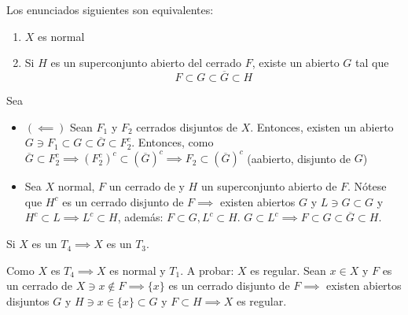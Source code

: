 \begin{teorema}
    Los enunciados siguientes son equivalentes: 
    \begin{enumerate}
        \item $X$ es normal 
        \item Si $H$ es un superconjunto abierto del cerrado $F$, existe un abierto $G$ tal que 
        $$F\subset G\subset \overline{G}\subset H$$
    \end{enumerate}
    \begin{dem}
        Sea
        \begin{itemize}
            \item $(\impliedby)$ Sean $F_1$ y $F_2$ cerrados disjuntos de $X$. Entonces, existen un abierto $G\ni F_1\subset G\subset \overline{G}\subset F_2^c$. Entonces, como $\overline{G}\subset F_2^c\implies (F_2^c)^c\subset (\overline{G})^c\implies F_2\subset (\overline{G})^c$ (aabierto, disjunto de $G$)
            \item Sea $X$ normal, $F$ un cerrado de y $H$ un superconjunto abierto de $F$. Nótese que $H^c$ es un cerrado disjunto de $F\implies$ existen abiertos $G$ y $L\ni G\subset G$ y $H^c \subset L\implies L^c\subset H$, además: $F\subset G,L^c\subset H$. $G\subset L^c\implies F\subset G\subset \overline{G}\subset H$. 
        \end{itemize}
    \end{dem}
\end{teorema}

\begin{prop}
    Si $X$ es un $T_4\implies X$ es un $T_3$.
\end{prop}

\begin{dem}
    Como $X$ es $T_4\implies X$ es normal y $T_1$. A probar: $X$ es regular. Sean $x\in X$ y $F$ es un cerrado de $X\ni x\not\in F\implies \{x\}$ es un cerrado disjunto de $F\implies $ existen abiertos disjuntos $G$ y $H\ni x\in \{x\}\subset G$ y $F\subset H\implies X$ es regular.   
\end{dem}